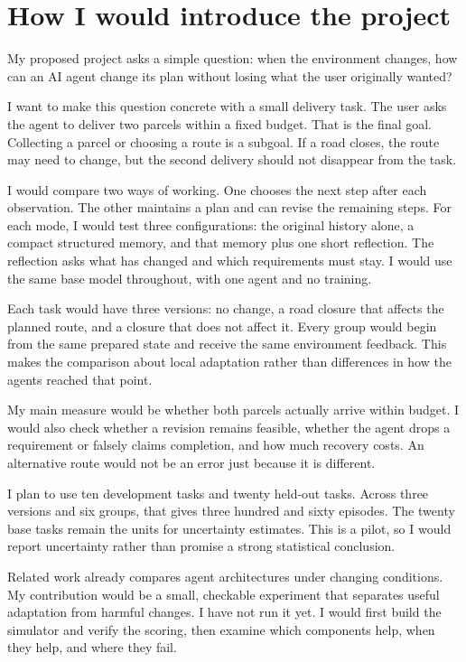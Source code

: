 \documentclass[11pt,a4paper]{article}
\begin{document}
\section{How I would introduce the project}
My proposed project asks a simple question: when the environment changes, how can an AI agent change its plan without losing what the user originally wanted?

I want to make this question concrete with a small delivery task. The user asks the agent to deliver two parcels within a fixed budget. That is the final goal. Collecting a parcel or choosing a route is a subgoal. If a road closes, the route may need to change, but the second delivery should not disappear from the task.

I would compare two ways of working. One chooses the next step after each observation. The other maintains a plan and can revise the remaining steps. For each mode, I would test three configurations: the original history alone, a compact structured memory, and that memory plus one short reflection. The reflection asks what has changed and which requirements must stay. I would use the same base model throughout, with one agent and no training.

Each task would have three versions: no change, a road closure that affects the planned route, and a closure that does not affect it. Every group would begin from the same prepared state and receive the same environment feedback. This makes the comparison about local adaptation rather than differences in how the agents reached that point.

My main measure would be whether both parcels actually arrive within budget. I would also check whether a revision remains feasible, whether the agent drops a requirement or falsely claims completion, and how much recovery costs. An alternative route would not be an error just because it is different.

I plan to use ten development tasks and twenty held-out tasks. Across three versions and six groups, that gives three hundred and sixty episodes. The twenty base tasks remain the units for uncertainty estimates. This is a pilot, so I would report uncertainty rather than promise a strong statistical conclusion.

Related work already compares agent architectures under changing conditions. My contribution would be a small, checkable experiment that separates useful adaptation from harmful changes. I have not run it yet. I would first build the simulator and verify the scoring, then examine which components help, when they help, and where they fail.
\end{document}
